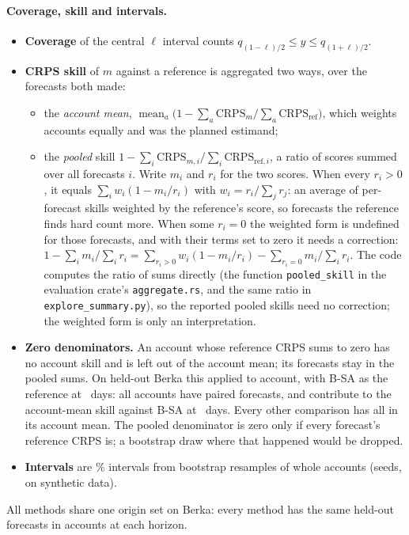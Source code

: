 \paragraph{Coverage, skill and intervals.}
\begin{itemize}
\item \textbf{Coverage} of the central $\ell$ interval counts
  $q_{(1-\ell)/2} \le y \le q_{(1+\ell)/2}$.
\item \textbf{CRPS skill} of $m$ against a reference is aggregated two
  ways, over the forecasts both made:
  \begin{itemize}
  \item the \emph{account mean},
    $\operatorname{mean}_a \bigl(1 - \sum_{a} \mathrm{CRPS}_m / \sum_{a}
    \mathrm{CRPS}_{\text{ref}}\bigr)$, which weights accounts equally and
    was the planned estimand;
  \item the \emph{pooled} skill
    $1 - \sum_i \mathrm{CRPS}_{m,i} / \sum_i \mathrm{CRPS}_{\text{ref},i}$, a
    ratio of scores summed over all forecasts $i$. Write $m_i$ and $r_i$
    for the two scores. When every $r_i > 0$, it equals
    $\sum_i w_i (1 - m_i/r_i)$ with $w_i = r_i / \sum_j r_j$: an average of
    per-forecast skills weighted by the reference's score, so forecasts the
    reference finds hard count more. When some $r_i = 0$ the weighted form
    is undefined for those forecasts, and with their terms set to zero it
    needs a correction:
    $1 - \sum_i m_i / \sum_i r_i = \sum_{r_i > 0} w_i (1 - m_i/r_i) -
    \sum_{r_i = 0} m_i / \sum_i r_i$. The code computes the ratio of sums
    directly (the function \texttt{pooled\_skill} in the evaluation
    crate's \texttt{aggregate.rs}, and the same ratio in
    \texttt{explore\_summary.py}), so the reported pooled
    skills need no correction; the weighted form is only an
    interpretation.
  \end{itemize}
\item \textbf{Zero denominators.} An account whose reference CRPS sums to
  zero has no account skill and is left out of the account mean; its
  forecasts stay in the pooled sums. On held-out Berka this applied to
   account, with B-SA as the reference at \hA\ days:
  all  accounts have paired forecasts,
  and  contribute to the account-mean
  skill against B-SA at \hA\ days. Every other comparison has all
   in its account mean. The pooled
  denominator is zero only if every forecast's reference CRPS is; a
  bootstrap draw where that happened would be dropped.
\item \textbf{Intervals} are \% intervals from
   bootstrap resamples of whole accounts (seeds, on
  synthetic data).
\end{itemize}
All methods share one origin set on Berka: every method has the same
 held-out forecasts in
 accounts at each horizon.


